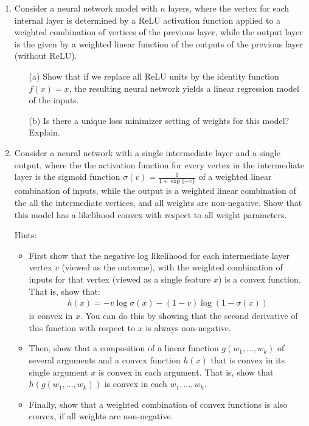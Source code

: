 \documentclass[11pt]{article}
\begin{document}
\begin{enumerate}

\item Consider a neural network model with $n$ layers, where the vertex for each internal layer is determined by a ReLU activation function applied to a weighted combination of vertices of the previous layer, while the output layer is the given by a weighted linear function of the outputs of the previous layer (without ReLU).

\begin{itemize}

\item[(a)] Show that if we replace all ReLU units by the identity function $f(x) = x$, the resulting neural network yields a linear regression model of the inputs.

\item[(b)] Is there a unique loss minimizer setting of weights for this model?  Explain.

\end{itemize}

\begin{answertext}{10cm}{}
  
\end{answertext} 

\pagebreak

\item Consider a neural network with a single intermediate layer and a single output, where the the activation function for every vertex in the intermediate layer is the sigmoid function $\sigma(v) = \frac{1}{1 + \exp\{ - v \}}$ of a weighted linear combination of inputs, while the output is a weighted linear combination of the all the intermediate vertices, and all weights are non-negative.  Show that this model has a likelihood convex with respect to all weight parameters.

Hints:
\begin{itemize}
\item First show that the negative log likelihood for each intermediate layer vertex $v$ (viewed as the outcome), with the weighted combination of inputs for that vertex (viewed as a single feature $x$) is a convex function.  That is, show that:
{
\begin{align*}
h(x) = - v \log \sigma(x) - (1 - v) \log ( 1 - \sigma(x) )
\end{align*}
}
is convex in $x$.  You can do this by showing that the second derivative of this function with respect to $x$ is always non-negative.
\item Then, show that a composition of a linear function $g(w_1, \ldots, w_k)$ of several arguments and a convex function $h(x)$ that is convex in its single argument $x$ is convex in each argument.  That is, show that $h(g(w_1, \ldots, w_k))$ is convex in each $w_1, \ldots, w_k$.
\item Finally, show that a weighted combination of convex functions is also convex, if all weights are non-negative.
\end{itemize}


\end{enumerate}
\end{document}
